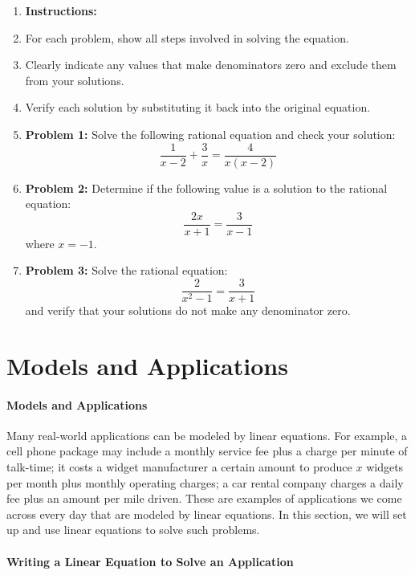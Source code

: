 \begin{enumerate}
    \item \textbf{Instructions:}
    \item For each problem, show all steps involved in solving the equation.
    \item Clearly indicate any values that make denominators zero and exclude them from your solutions.
    \item Verify each solution by substituting it back into the original equation.
    \item \textbf{Problem 1:} Solve the following rational equation and check your solution: $$ \frac{1}{x-2} + \frac{3}{x} = \frac{4}{x(x-2)} $$
    \item \textbf{Problem 2:} Determine if the following value is a solution to the rational equation: $$ \frac{2x}{x+1} = \frac{3}{x-1} $$ where \( x = -1 \).
    \item \textbf{Problem 3:} Solve the rational equation: $$ \frac{2}{x^2-1} = \frac{3}{x+1} $$ and verify that your solutions do not make any denominator zero.
\end{enumerate}

\section{Models and Applications}
\label{sec:models-and-applications}

\paragraph{Models and Applications}

Many real-world applications can be modeled by linear equations. For example, a cell phone package may include a monthly service fee plus a charge per minute of talk-time; it costs a widget manufacturer a certain amount to produce $x$ widgets per month plus monthly operating charges; a car rental company charges a daily fee plus an amount per mile driven. These are examples of applications we come across every day that are modeled by linear equations. In this section, we will set up and use linear equations to solve such problems.

\paragraph{Writing a Linear Equation to Solve an Application}

